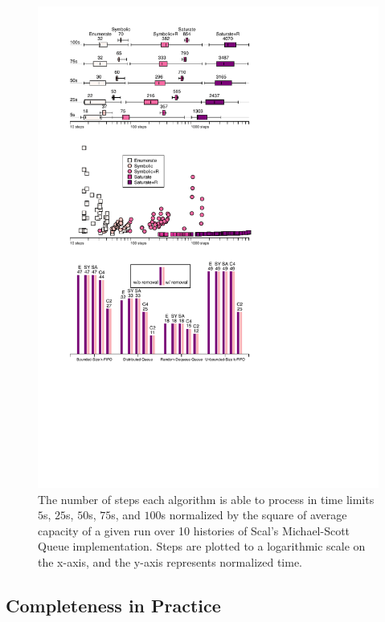 \begin{figure}[t]

  \centering
  \includegraphics[width=\linewidth]{figures/steps-until-timeout-normalized}

  \caption{The number of steps each algorithm is able to process in time limits
  $5$s, $25$s, $50$s, $75$s, and $100$s normalized by the square of average
  capacity of a given run over 10 histories of Scal’s Michael-Scott Queue
  implementation. Steps are plotted to a logarithmic scale on the x-axis, and
  the y-axis represents normalized time.}

  \label{fig:steps:normalized}

\end{figure}

\subsection{Completeness in Practice}
\label{sec:exp:complete}


